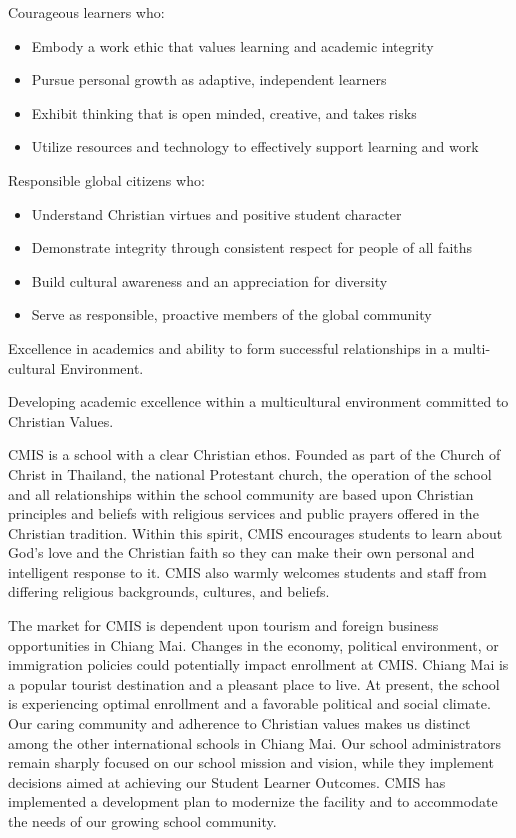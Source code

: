 Courageous learners who:
\begin{itemize}
\item Embody a work ethic that values learning and academic integrity
\item Pursue personal growth as adaptive, independent learners
\item Exhibit thinking that is open minded, creative, and takes risks
\item Utilize resources and technology to effectively support learning and work
\end{itemize}

Responsible global citizens who:
\begin{itemize}
\item Understand Christian virtues and positive student character
\item Demonstrate integrity through consistent respect for people of all faiths
\item Build cultural awareness and an appreciation for diversity
\item Serve as responsible, proactive members of the global community
\end{itemize}


Excellence in academics and ability to form successful relationships in a multi-cultural Environment.

 
Developing academic excellence within a multicultural environment committed to Christian Values.


CMIS is a school with a clear Christian ethos.  Founded as part of the Church of Christ in Thailand, the national Protestant church, the operation of the school and all relationships within the school community are based upon Christian principles and beliefs with religious services and public prayers offered in the Christian tradition.  Within this spirit, CMIS encourages students to learn about God’s love and the Christian faith so they can make their own personal and intelligent response to it.  CMIS also warmly welcomes students and staff from differing religious backgrounds, cultures, and beliefs.



The market for CMIS is dependent upon tourism and foreign business opportunities in Chiang Mai.  Changes in the economy, political environment, or immigration policies could potentially impact enrollment at CMIS.  Chiang Mai is a popular tourist destination and a pleasant place to live.  At present, the school is experiencing optimal enrollment and a favorable political and social climate.  Our caring community and adherence to Christian values makes us distinct among the other international schools in Chiang Mai.  Our school administrators remain sharply focused on our school mission and vision, while they implement decisions aimed at achieving our Student Learner Outcomes.  CMIS has implemented a development plan to modernize the facility and to accommodate the needs of our growing school community.  


